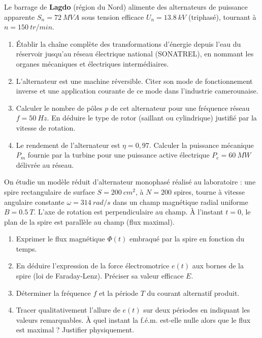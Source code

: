 \documentclass[11pt]{article}
\begin{document}
\begin{exercice}
Le barrage de \textbf{Lagdo} (région du Nord) alimente des alternateurs de puissance apparente $S_n = \SI{72}{MVA}$ sous tension efficace $U_n = \SI{13.8}{kV}$ (triphasé), tournant à $n = \SI{150}{tr/min}$.

\begin{enumerate}
    \item Établir la chaîne complète des transformations d'énergie depuis l'eau du réservoir jusqu'au réseau électrique national (SONATREL), en nommant les organes mécaniques et électriques intermédiaires.
    \item L'alternateur est une machine réversible. Citer son mode de fonctionnement inverse et une application courante de ce mode dans l'industrie camerounaise.
    \item Calculer le nombre de pôles $p$ de cet alternateur pour une fréquence réseau $f = \SI{50}{Hz}$. En déduire le type de rotor (saillant ou cylindrique) justifié par la vitesse de rotation.
    \item Le rendement de l'alternateur est $\eta = 0,97$. Calculer la puissance mécanique $P_m$ fournie par la turbine pour une puissance active électrique $P_e = \SI{60}{MW}$ délivrée au réseau.
\end{enumerate}
\end{exercice}

\begin{exercice}
On étudie un modèle réduit d'alternateur monophasé réalisé au laboratoire : une spire rectangulaire de surface $S = \SI{200}{cm^2}$, à $N = 200$ spires, tourne à vitesse angulaire constante $\omega = \SI{314}{rad/s}$ dans un champ magnétique radial uniforme $B = \SI{0.5}{T}$. L'axe de rotation est perpendiculaire au champ. À l'instant $t=0$, le plan de la spire est parallèle au champ (flux maximal).

\begin{enumerate}
    \item Exprimer le flux magnétique $\Phi(t)$ embraqué par la spire en fonction du temps.
    \item En déduire l'expression de la force électromotrice $e(t)$ aux bornes de la spire (loi de Faraday-Lenz). Préciser sa valeur efficace $E$.
    \item Déterminer la fréquence $f$ et la période $T$ du courant alternatif produit.
    \item Tracer qualitativement l'allure de $e(t)$ sur deux périodes en indiquant les valeurs remarquables. À quel instant la f.é.m. est-elle nulle alors que le flux est maximal ? Justifier physiquement.
\end{enumerate}
\end{exercice}
\end{document}
